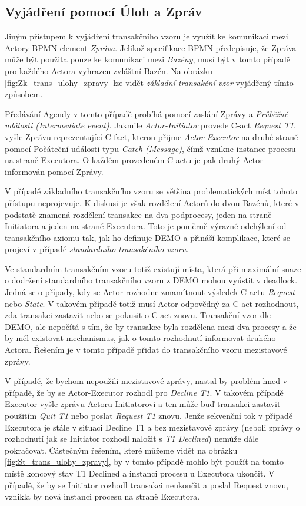 \documentclass[]{article}
\begin{document}
\subsection{Vyjádření pomocí Úloh a Zpráv}
Jiným přístupem k vyjádření transakčního vzoru je využít ke komunikaci mezi Actory BPMN element \textit{Zpráva}. Jelikož specifikace BPMN předepisuje, že Zpráva může být použita pouze ke komunikaci mezi \textit{Bazény}, musí být v tomto případě pro každého Actora vyhrazen zvláštní Bazén. Na obrázku \ref{fig:Zk_trans_ulohy_zpravy} lze vidět \textit{základní transakční vzor} vyjádřený tímto způsobem.

Předávání Agendy v tomto případě probíhá pomocí zaslání Zprávy a  \textit{Průběžné události (Intermediate event)}. Jakmile \textit{Actor-Initiator} provede C-act \textit{Request T1}, vyšle Zprávu reprezentující C-fact, kterou přijme \textit{Actor-Executor} na druhé straně pomocí Počáteční události typu \textit{Catch (Message)}, čímž vznikne instance procesu na straně Executora. O každém provedeném C-actu je pak druhý Actor informován pomocí Zprávy. 

V případě základního transakčního vzoru se většina problematických míst tohoto přístupu neprojevuje. K diskusi je však rozdělení Actorů do dvou Bazénů, které v podstatě znamená rozdělení transakce na dva podprocesy, jeden na straně Initiatora a jeden na straně Executora. Toto je poměrně výrazné odchýlení od transakčního axiomu tak, jak ho definuje DEMO a přináší komplikace, které se projeví v případě \textit{standardního transakčního vzoru}.

Ve standardním transakčním vzoru totiž existují místa, která při maximální snaze o dodržení standardního transakčního vzoru z DEMO mohou vyústit v deadlock. Jedná se o případy, kdy se Actor rozhodne zmamítnout výsledek C-actu \textit{Request} nebo \textit{State}. V takovém případě totiž musí Actor odpovědný za C-act rozhodnout, zda transakci zastavit nebo se pokusit o C-act znovu. Transakční vzor dle DEMO, ale nepočítá s tím, že by transakce byla rozdělena mezi dva procesy a že by měl existovat mechanismus, jak o tomto rozhodnutí informovat druhého Actora. Řešením je v tomto případě přidat do transakčního vzoru mezistavové zprávy.

V případě, že bychom nepoužili mezistavové zprávy, nastal by problém hned v případě, že by se Actor-Executor rozhodl pro \textit{Decline T1}. V takovém případě Executor vyšle zprávu Actoru-Initiatorovi a ten může buď transakci zastavit použitím \textit{Quit T1} nebo poslat \textit{Request T1} znovu. Jenže sekvenční tok v případě Executora je stále v situaci Decline T1 a bez mezistavové zprávy (neboli zprávy o rozhodnutí jak se Initiator rozhodl naložit s \textit{T1 Declined}) nemůže dále pokračovat. Částečným řešením, které můžeme vidět na obrázku \ref{fig:St_trans_ulohy_zpravy}, by v tomto případě mohlo být použít na tomto místě koncový stav T1 Declined a instanci procesu u Executora ukončit. V případě, že by se Initiator rozhodl transakci neukončit a poslal Request znovu, vznikla by nová instanci procesu na straně Executora.
\end{document}
